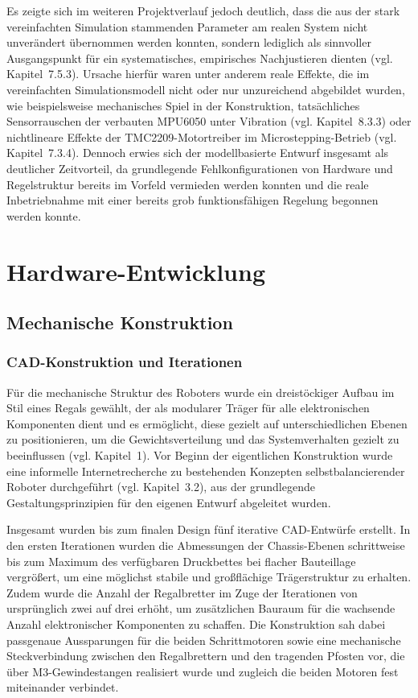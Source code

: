 \documentclass[12pt,ngerman,numbers=noenddot,abstracton,headsepline]{scrreprt}
\begin{document}
Es zeigte sich im weiteren Projektverlauf jedoch deutlich, dass die aus der stark vereinfachten Simulation stammenden Parameter am realen System nicht unverändert übernommen werden konnten, sondern lediglich als sinnvoller Ausgangspunkt für ein systematisches, empirisches Nachjustieren dienten (vgl. Kapitel~7.5.3). Ursache hierfür waren unter anderem reale Effekte, die im vereinfachten Simulationsmodell nicht oder nur unzureichend abgebildet wurden, wie beispielsweise mechanisches Spiel in der Konstruktion, tatsächliches Sensorrauschen der verbauten MPU6050 unter Vibration (vgl. Kapitel~8.3.3) oder nichtlineare Effekte der TMC2209-Motortreiber im Microstepping-Betrieb (vgl. Kapitel~7.3.4). Dennoch erwies sich der modellbasierte Entwurf insgesamt als deutlicher Zeitvorteil, da grundlegende Fehlkonfigurationen von Hardware und Regelstruktur bereits im Vorfeld vermieden werden konnten und die reale Inbetriebnahme mit einer bereits grob funktionsfähigen Regelung begonnen werden konnte.

\chapter{Hardware-Entwicklung}
\label{ch:hardware}

\section{Mechanische Konstruktion}
\label{sec:mechanische_konstruktion}

\subsection{CAD-Konstruktion und Iterationen}
\label{subsec:cad_iterationen}

Für die mechanische Struktur des Roboters wurde ein dreistöckiger Aufbau im Stil eines Regals gewählt, der als modularer Träger für alle elektronischen Komponenten dient und es ermöglicht, diese gezielt auf unterschiedlichen Ebenen zu positionieren, um die Gewichtsverteilung und das Systemverhalten gezielt zu beeinflussen (vgl. Kapitel~1). Vor Beginn der eigentlichen Konstruktion wurde eine informelle Internetrecherche zu bestehenden Konzepten selbstbalancierender Roboter durchgeführt (vgl. Kapitel~3.2), aus der grundlegende Gestaltungsprinzipien für den eigenen Entwurf abgeleitet wurden.

Insgesamt wurden bis zum finalen Design fünf iterative CAD-Entwürfe erstellt. In den ersten Iterationen wurden die Abmessungen der Chassis-Ebenen schrittweise bis zum Maximum des verfügbaren Druckbettes bei flacher Bauteillage vergrößert, um eine möglichst stabile und großflächige Trägerstruktur zu erhalten. Zudem wurde die Anzahl der Regalbretter im Zuge der Iterationen von ursprünglich zwei auf drei erhöht, um zusätzlichen Bauraum für die wachsende Anzahl elektronischer Komponenten zu schaffen. Die Konstruktion sah dabei passgenaue Aussparungen für die beiden Schrittmotoren sowie eine mechanische Steckverbindung zwischen den Regalbrettern und den tragenden Pfosten vor, die über M3-Gewindestangen realisiert wurde und zugleich die beiden Motoren fest miteinander verbindet.
\end{document}
